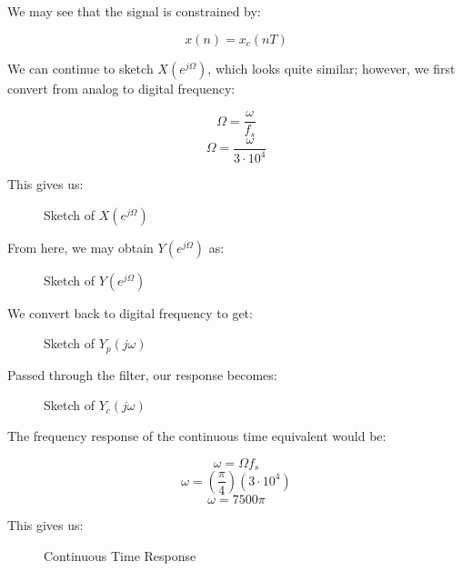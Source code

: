 \begin{enumerate}
\begin{enumerate}
        We may see that the signal is constrained by:

        $$x(n)=x_c(nT)$$

        We can continue to sketch $X(e^{j\Omega})$, which looks quite similar; however, we first convert from analog to digital frequency:

        $$\Omega=\frac{\omega}{f_s}$$
        $$\Omega=\frac{\omega}{3\cdot10^4}$$

        This gives us:
        
        \begin{figure}[H]
          \centering
          
          \caption{Sketch of $X(e^{j\Omega})$}
          \label{fig:3}
        \end{figure}

        From here, we may obtain $Y(e^{j\Omega})$ as:

        \begin{figure}[H]
          \centering
          
          \caption{Sketch of $Y(e^{j\Omega})$}
          \label{fig:4}
        \end{figure}

        We convert back to digital frequency to get:

        \begin{figure}[H]
          \centering
          
          \caption{Sketch of $Y_p(j\omega)$}
          \label{fig:5}
        \end{figure}

        Passed through the filter, our response becomes:

        \begin{figure}[H]
          \centering
          
          \caption{Sketch of $Y_c(j\omega)$}
          \label{fig:6}
        \end{figure}

        The frequency response of the continuous time equivalent would be:

        $$\omega=\Omega f_s$$
        $$\omega=\left( \frac{\pi}{4} \right)\left( 3\cdot10^4 \right)$$
        $$\boxed{\omega=7500\pi}$$

        This gives us:

        \begin{figure}[H]
          \centering
          
          \caption{Continuous Time Response}
          \label{fig:7}
        \end{figure}


\end{enumerate}
\end{enumerate}
